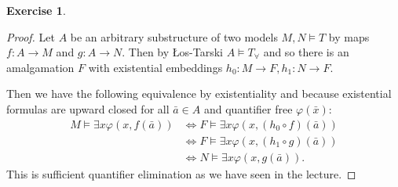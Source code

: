 \documentclass{article}
\theoremstyle{definition}
\newtheorem{question}{Exercise}
\begin{document}
\begin{question}
\begin{enumerate}[(1)]
              \begin{proof}
                  Let \(A\) be an arbitrary substructure of two models
                  \(M,N\models T\) by maps \(f:A\to M\) and \(g:A\to N\). Then
                  by \L{}os-Tarski \(A\models T_{\forall}\) and so there is an
                  amalgamation \(F\) with existential embeddings \(h_{0}:M\to
                  F,h_{1}:N\to F\).

                  Then we have the following equivalence by existentiality and
                  because existential formulas are upward closed for all
                  \(\bar{a}\in A\) and quantifier free \(\varphi(\bar{x})\):
                  \begin{align*}
                      M\models\exists x\varphi(x,f(\bar{a})) & \Leftrightarrow F\models\exists x\varphi(x,(h_{0}\circ f)(\bar{a})) \\
                                                             & \Leftrightarrow F\models\exists x\varphi(x,(h_{1}\circ g)(\bar{a})) \\
                                                             & \Leftrightarrow N\models\exists x\varphi(x,g(\bar{a})).
                  \end{align*}
                  This is sufficient quantifier elimination as we have seen in
                  the lecture.
              \end{proof}
    \end{enumerate}
\end{question}
\end{document}
